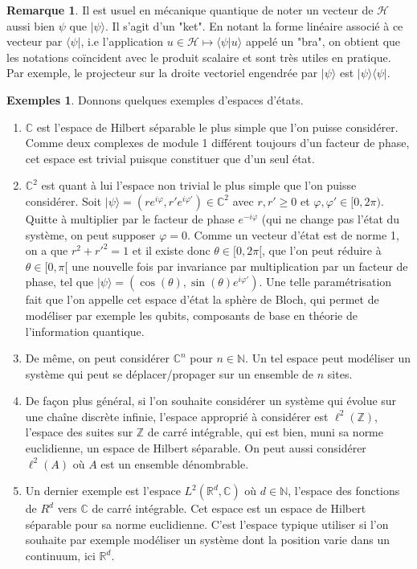 \documentclass[12pt,openany,a4paper, titlepage]{article}
\newcommand{\lp}{\left(}
\newcommand{\rp}{\right)}
\newcommand{\R}{\mathbb{R}}
\newcommand{\C}{\mathbb{C}}
\newcommand{\Z}{\mathbb{Z}}
\newcommand{\N}{\mathbb{N}}
\newcommand{\HH}{\mathcal{H}}
\newcommand{\vp}{\varphi}
\theoremstyle{definition}
\theoremstyle{definition}
\theoremstyle{definition}
\theoremstyle{definition}
\newtheorem{exs}{Exemples}
\theoremstyle{definition}
\newtheorem{rem}{Remarque}
\theoremstyle{definition}
\begin{document}
\begin{rem}
    Il est usuel en mécanique quantique de noter un vecteur 
    de $\HH$ aussi bien $\psi$ que $|\psi\rangle$. Il s'agit d'un "ket". En notant la forme linéaire associé à ce vecteur par $\langle\psi |$, i.e l'application $u\in\HH \mapsto \langle \psi | u\rangle$ appelé un "bra", on obtient que les notations coïncident avec le produit scalaire et sont très utiles en pratique. Par exemple, le projecteur sur la droite vectoriel engendrée par $|\psi\rangle$ est $|\psi\rangle\langle\psi |$.
\end{rem}

\begin{exs}
    Donnons quelques exemples d'espaces d'états.
    \begin{enumerate}
        \item[1] $\C$ est l'espace de Hilbert séparable le plus simple que l'on puisse considérer. Comme deux complexes de module 1 différent toujours d'un facteur de phase, cet espace est trivial puisque constituer que d'un seul état.
        \item[2] $\C^2$ est quant à lui l'espace non trivial le plus simple que l'on puisse considérer. Soit $|\psi\rangle = (re^{i\vp}, r'e^{i\vp'}) \in \C^2$ avec $r,r'\geq 0$ et $\vp, \vp' \in [0,2\pi)$. Quitte à multiplier par le facteur de phase $e^{-i\vp}$ (qui ne change pas l'état du système, on peut supposer $\vp = 0$. Comme un vecteur d'état est de norme 1, on a que $r^2 + r'^2 = 1$ et il existe donc $\theta \in [0,2\pi[$, que l'on peut réduire à $\theta \in [0,\pi[$ une nouvelle fois par invariance par multiplication par un facteur de phase, tel que $|\psi\rangle = \lp \cos(\theta), \sin(\theta)e^{i\vp'}\rp$. Une telle paramétrisation fait que l'on appelle cet espace d'état la sphère de Bloch, qui permet de modéliser par exemple les qubits, composants de base en théorie de l'information quantique.
        \item[3] De même, on peut considérer $\C^n$ pour $n\in\N$. Un tel espace peut modéliser un système qui peut se déplacer/propager sur un ensemble de $n$ sites.
        \item[4]  De façon plus général, si l'on souhaite considérer un système qui évolue sur une chaîne discrète infinie, l'espace approprié à considérer est $\ell^2(\Z)$, l'espace des suites sur $\Z$ de carré intégrable, qui est bien, muni sa norme euclidienne, un espace de Hilbert séparable. On peut aussi considérer $\ell^2(A)$ où $A$ est un ensemble dénombrable.
        \item[5] Un dernier exemple est l'espace $L^2(\R^d,\C)$ où $d\in\N$, l'espace des fonctions de $R^d$ vers $\C$ de carré intégrable. Cet espace est un espace de Hilbert séparable pour sa norme euclidienne. C'est l'espace typique utiliser si l'on souhaite par exemple modéliser un système dont la position varie dans un continuum, ici $\R^d$.
    \end{enumerate}
\end{exs}
\end{document}
